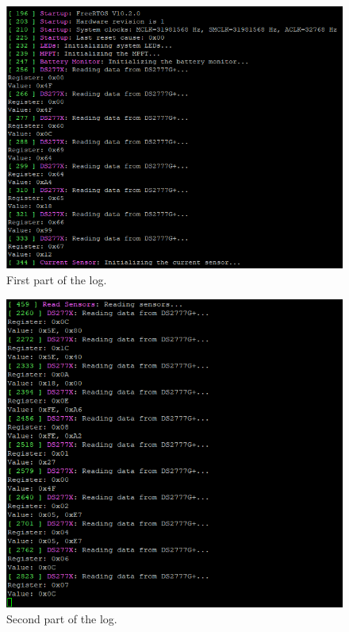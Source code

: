 \begin{figure}[!ht]
    \begin{center}
        \includegraphics[width=0.7\columnwidth]{figures/ds2777g_log_1.png}
        \caption{First part of the log.}
        \label{fig:test-battery-monitor-1}
    \end{center}
\end{figure}

\begin{figure}[!ht]
    \begin{center}
        \includegraphics[width=0.7\columnwidth]{figures/ds2777g_log_2.png}
        \caption{Second part of the log.}
        \label{fig:test-battery-monitor-2}
    \end{center}
\end{figure}

\newpage

